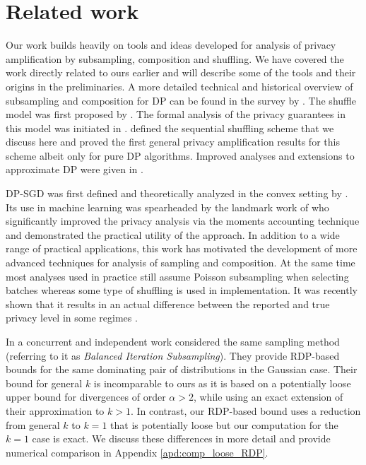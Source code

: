 \section{Related work}
Our work builds heavily on tools and ideas developed for analysis of privacy amplification by subsampling, composition and shuffling. We have covered the work directly related to ours earlier and will describe some of the tools and their origins in the preliminaries. A more detailed technical and historical overview of subsampling and composition for DP can be found in the survey by \citet{Steinke22}.  The shuffle model was first proposed by \citet{BEMMRLRKTS17}. The formal analysis of the privacy guarantees in this model was initiated in \citep{EFMRTT19, CSUZZ19}.  \citet{EFMRTT19} defined the sequential shuffling scheme that we discuss here and proved the first general privacy amplification results for this scheme albeit only for pure DP algorithms. Improved analyses and extensions to approximate DP were given in \citep{BBGN19, BKMT20, FMT21, FMT23,GDDKS21,KHH22}.

DP-SGD was first defined and theoretically analyzed in the convex setting by \citet{BST14}. Its use in machine learning was spearheaded by the landmark work of 
\citet{ACGMMT16} who significantly improved the privacy analysis via the moments accounting technique and demonstrated the practical utility of the approach. In addition to a wide range of practical applications, this work  has motivated the development of more advanced techniques for analysis of sampling and composition. At the same time most analyses used in practice still assume Poisson subsampling when selecting batches whereas some type of shuffling is used in implementation. It was recently shown that it results in an actual difference between the reported and true privacy level in some regimes \citep{CGKKMSZ24a, CGKKMSZ24b, ABDCH24}.

In a concurrent and independent work \citet{DCO25} considered the same sampling method (referring to it as \emph{Balanced Iteration Subsampling}). They provide RDP-based bounds for the same dominating pair of distributions in the Gaussian case. 
 Their bound for general $k$ is incomparable to ours as it is based on a potentially loose upper bound for divergences of order $\alpha > 2$, while using an exact extension of their approximation to $k > 1$. In contrast, our RDP-based bound uses a reduction from general $k$ to $k=1$ that is potentially loose but our computation for the $k=1$ case is exact. We discuss these differences in more detail and provide numerical comparison in Appendix \ref{apd:comp_loose_RDP}.

